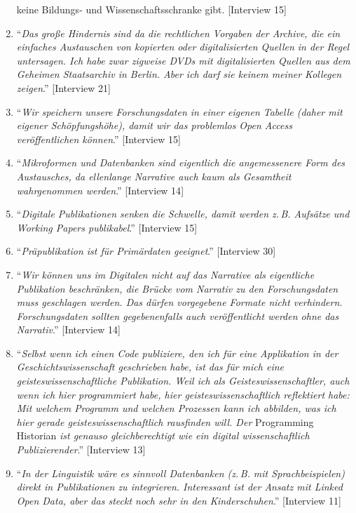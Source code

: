 \documentclass[a4paper,
fontsize=11pt,
oneside,
numbers=noperiodatend,
parskip=half-,
bibliography=totoc,
final
]{scrartcl}
\begin{document}
\begin{enumerate}
{{  keine Bildungs- und Wissenschaftsschranke gibt}.} {[}Interview 15{]}
\item
  \enquote{\emph{Das große Hindernis sind da die rechtlichen Vorgaben
  der Archive, die ein einfaches Austauschen von kopierten oder
  digitalisierten Quellen in der Regel untersagen. Ich habe zwar
  zigweise DVDs mit digitalisierten Quellen aus dem Geheimen
  Staatsarchiv in Berlin. Aber ich darf sie keinem meiner Kollegen
  zeigen}.} {[}Interview 21{]}
\item
  \enquote{\emph{Wir speichern unsere Forschungsdaten in einer eigenen
  Tabelle (daher mit eigener Schöpfungshöhe), damit wir das problemlos
  Open Access veröffentlichen können}.} {[}Interview 15{]}
\item
  \enquote{\emph{Mikroformen und Datenbanken sind eigentlich die
  angemessenere Form des Austausches, da ellenlange Narrative auch kaum
  als Gesamtheit wahrgenommen werden}.} {[}Interview 14{]}
\item
  \enquote{\emph{Digitale Publikationen senken die Schwelle, damit
  werden z.\,B. Aufsätze und Working Papers publikabel}.} {[}Interview
  15{]}
\item
  \enquote{\emph{Präpublikation ist für Primärdaten geeignet}.}
  {[}Interview 30{]}
\item
  \enquote{\emph{Wir können uns im Digitalen nicht auf das Narrative als
  eigentliche Publikation beschränken, die Brücke vom Narrativ zu den
  Forschungsdaten muss geschlagen werden. Das dürfen vorgegebene Formate
  nicht verhindern. Forschungsdaten sollten gegebenenfalls auch
  veröffentlicht werden ohne das Narrativ}.} {[}Interview 14{]}
\item
  \enquote{\emph{Selbst wenn ich einen Code publiziere, den ich für eine
  Applikation in der Geschichtswissenschaft geschrieben habe, ist das
  für mich eine geisteswissenschaftliche Publikation. Weil ich als
  Geisteswissenschaftler, auch wenn ich hier programmiert habe, hier
  geisteswissenschaftlich reflektiert habe: Mit welchem Programm und
  welchen Prozessen kann ich abbilden, was ich hier gerade
  geisteswissenschaftlich rausfinden will. Der} Programming Historian
  \emph{ist genauso gleichberechtigt wie ein digital wissenschaftlich
  Publizierender}.} {[}Interview 13{]}
\item
  \enquote{\emph{In der Linguistik wäre es sinnvoll Datenbanken (z.\,B.
  mit Sprachbeispielen) direkt in Publikationen zu integrieren.
  Interessant ist der Ansatz mit Linked Open Data, aber das steckt noch
  sehr in den Kinderschuhen}.} {[}Interview 11{]}

\end{enumerate}
\end{document}
